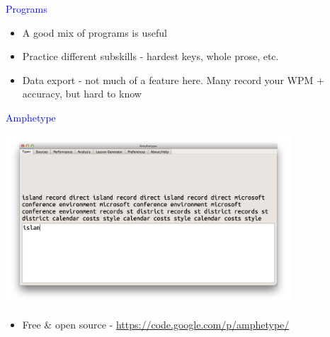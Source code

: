 \documentclass[landscape]{slides}
\begin{document}
\begin{slide}

    \textcolor{blue}{\Large{Programs}}

    \begin{itemize}
        \item A good mix of programs is useful
        \item Practice different subskills - hardest keys, whole prose, etc.
        \item Data export - not much of a feature here. Many record your WPM + accuracy, but hard to know
    \end{itemize}

\end{slide}


\begin{slide}

    \textcolor{blue}{\Large{Amphetype}}

    \centering

    \includegraphics[width=0.8\textwidth]{amphetype-screenshot}

    \begin{itemize}
        \item Free & open source - \url{https://code.google.com/p/amphetype/}
    \end{itemize}

\end{slide}
\end{document}
